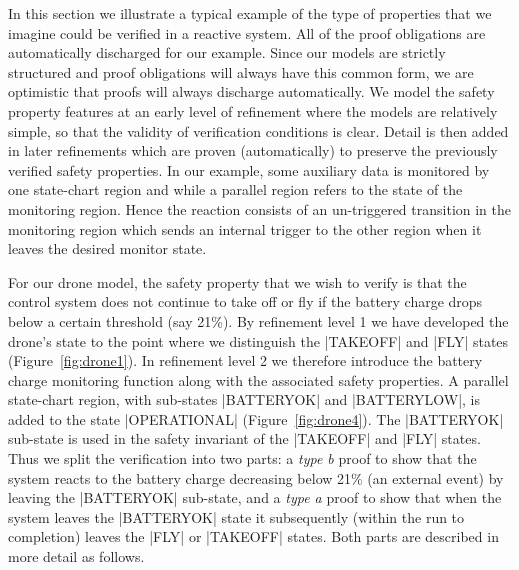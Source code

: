In this section we illustrate a typical example of the type of properties that we imagine could be verified in a reactive \SCXML system.
All of the proof obligations are automatically discharged for our example.
Since our models are strictly structured and proof obligations will always have this common form, we are optimistic that proofs will always discharge automatically.
We model the safety property features at an early level of refinement where the models are relatively simple, so that the validity of verification conditions is clear. 
Detail is then added in later refinements which are proven (automatically) to preserve the previously verified safety properties.
In our example, some auxiliary data is monitored by one state-chart region and while a parallel region refers to the state of the monitoring region. 
Hence the reaction consists of an un-triggered transition in the monitoring region which sends an internal trigger to the other region when it leaves the desired monitor state.

For our drone model, the safety property that we wish to verify is that the control system does not continue to take off or fly if the battery charge drops below a certain threshold (say 21\%). 
By refinement level 1 we have developed the drone's state to the point where we distinguish the |TAKEOFF| and |FLY| states (Figure~\ref{fig:drone1}).
In refinement level 2 we therefore introduce the battery charge monitoring function along with the associated safety properties.
A parallel state-chart region, with sub-states |BATTERYOK| and |BATTERYLOW|, is added to the state |OPERATIONAL| (Figure~\ref{fig:drone4}).
The |BATTERYOK| sub-state is used in the safety invariant of the |TAKEOFF| and |FLY| states.
Thus we split the verification into two parts: a \emph{type b} proof to show that the system reacts to the battery charge decreasing below 21\% (an external event) by leaving the  |BATTERYOK| sub-state, and a \emph{type a} proof to show that when the system leaves the |BATTERYOK| state it subsequently (within the run to completion) leaves the |FLY| or |TAKEOFF| states. 
Both parts are described in more detail as follows.

